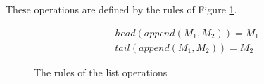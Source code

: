 These operations are defined by the rules of Figure \ref{listoprules}.

\begin{figure}[h]
	\begin{align*}
		&head(append(M_1, M_2)) = M_1 \tag{Head} \\
		&tail(append(M_1, M_2)) = M_2 \tag{Tail}
	\end{align*}
	\caption{The rules of the list operations}
	\label{listoprules}
\end{figure}

\FloatBarrier


